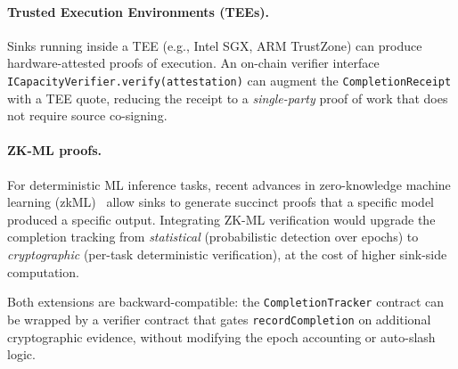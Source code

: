 \paragraph{Trusted Execution Environments (TEEs).}
Sinks running inside a TEE (e.g., Intel SGX, ARM TrustZone) can produce
hardware-attested proofs of execution.  An on-chain verifier interface
\texttt{ICapacityVerifier.verify(attestation)} can augment the
\texttt{CompletionReceipt} with a TEE quote, reducing the receipt to a
\emph{single-party} proof of work that does not require source co-signing.

\paragraph{ZK-ML proofs.}
For deterministic ML inference tasks, recent advances in zero-knowledge
machine learning (zkML)~\cite{kang2022zkml} allow sinks to generate succinct
proofs that a specific model produced a specific output.  Integrating ZK-ML
verification would upgrade the completion tracking from \emph{statistical}
(probabilistic detection over epochs) to \emph{cryptographic} (per-task
deterministic verification), at the cost of higher sink-side computation.

Both extensions are backward-compatible: the \texttt{CompletionTracker}
contract can be wrapped by a verifier contract that gates
\texttt{recordCompletion} on additional cryptographic evidence, without
modifying the epoch accounting or auto-slash logic.
